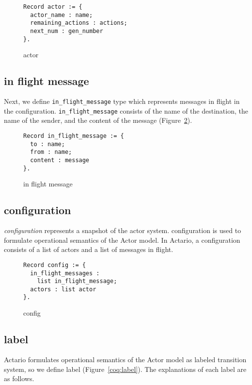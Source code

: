 \begin{figure}[t]
\begin{lstlisting}
Record actor := {
  actor_name : name;
  remaining_actions : actions;
  next_num : gen_number
}.
\end{lstlisting}
\caption{actor}\label{coq:actor}
\end{figure}

\subsection{in flight message}
Next, we define \lstinline|in_flight_message| type which represents messages in flight in the configuration.
\break\lstinline|in_flight_message| consists of the name of the destination, the name of the sender, and the content of the message (Figure~\ref{coq:inflight}).

\begin{figure}[t]
\begin{lstlisting}
Record in_flight_message := {
  to : name;
  from : name;
  content : message
}.
\end{lstlisting}
\caption{in flight message}\label{coq:inflight}
\end{figure}

\subsection{configuration}
\textit{configuration} represents a snapshot of the actor system.
configuration is used to formulate operational semantics of the Actor model.
In Actario, a configuration consists of a list of actors and a list of messages in flight.

\begin{figure}[t]
\begin{lstlisting}
Record config := {
  in_flight_messages :
    list in_flight_message;
  actors : list actor
}.
\end{lstlisting}
\caption{config}\label{coq:config}
\end{figure}


\subsection{label}
Actario formulates operational semantics of the Actor model as labeled transition system, so we define label (Figure~\ref{coq:label}).
The explanations of each label are as follows.

